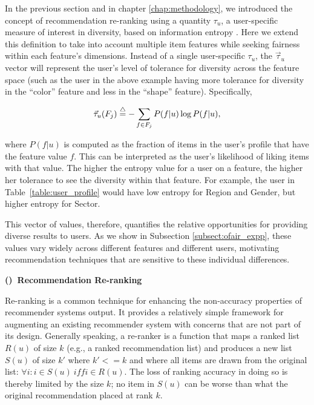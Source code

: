 In the previous section and in chapter \ref{chap:methodology}, we introduced the concept of recommendation re-ranking using a quantity $\tau_u$, a user-specific measure of interest in diversity, based on information entropy \cite{liu2018personalizing,liu2019personalized}. Here we extend this definition to take into account multiple item features while seeking fairness within each feature's dimensions. Instead of a single user-specific $\tau_u$, the $\vec{\tau}_u$ vector will represent the user's level of tolerance for diversity across the feature space (such as the user in the above example having more tolerance for diversity in the ``color'' feature and less in the ``shape'' feature). Specifically,

\begin{equation}
\vec{\tau}_u(F_{j})\buildrel\triangle\over=-\sum_{f \in F_j} P(f|u)\log P(f|u),
\label{eq:tau}
\end{equation}
\vspace{0.25cm}

where $P(f|u)$ is computed as the fraction of items in the user's profile that have the feature value $f$. This can be interpreted as the user's likelihood of liking items with that value. The higher the entropy value for a user on a feature, the higher her tolerance to see the diversity within that feature. For example, the user in Table~\ref{table:user_profile} would have low entropy for Region and Gender, but higher entropy for Sector.

This vector of values, therefore, quantifies the relative opportunities for providing diverse results to users. As we show in Subsection \ref{subsect:ofair_expp}, these values vary widely across different features and different users, motivating recommendation techniques that are sensitive to these individual differences.

\vspace{0.25cm}
\noindent \textbf{()~Recommendation Re-ranking}
\vspace{0.25cm}

Re-ranking is a common technique for enhancing the non-accuracy properties of recommender systems output. It provides a relatively simple framework for augmenting an existing recommender system with concerns that are not part of its design. Generally speaking, a re-ranker is a function that maps a ranked list $R(u)$ of size $k$ (e.g., a ranked recommendation list) and produces a new list $S(u)$ of size $k'$ where $k'<= k$ and where all items are drawn from the original list: $\forall{i}: i \in S(u) ~\mathit{iff} i\in R(u)$. The loss of ranking accuracy in doing so is thereby limited by the size $k$; no item in $S(u)$ can be worse than what the original recommendation placed at rank $k$. 

